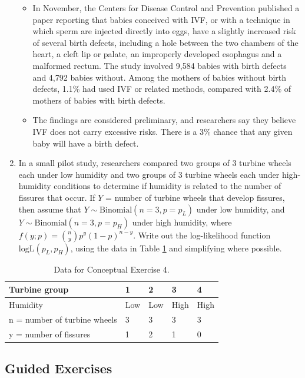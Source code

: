 \documentclass[
]{krantz}
\begin{document}
\begin{enumerate}
  \begin{itemize}
  \item
    In November, the Centers for Disease Control and Prevention published a paper reporting that babies conceived with IVF, or with a technique in which sperm are injected directly into eggs, have a slightly increased risk of several birth defects, including a hole between the two chambers of the heart, a cleft lip or palate, an improperly developed esophagus and a malformed rectum. The study involved 9,584 babies with birth defects and 4,792 babies without. Among the mothers of babies without birth defects, 1.1\% had used IVF or related methods, compared with 2.4\% of mothers of babies with birth defects.
  \item
    The findings are considered preliminary, and researchers say they believe IVF does not carry excessive risks. There is a 3\% chance that any given baby will have a birth defect.
  \end{itemize}
\item
  In a small pilot study, researchers compared two groups of 3 turbine wheels each under low humidity and two groups of 3 turbine wheels each under high-humidity conditions to determine if humidity is related to the number of fissures that occur. If \(Y\) = number of turbine wheels that develop fissures, then assume that \(Y \sim \textrm{Binomial}(n=3, p=p_L)\) under low humidity, and \(Y \sim \textrm{Binomial}(n=3, p=p_H)\) under high humidity, where \(f(y;p)=\binom{n}{y} p^y (1-p)^{n-y}\). Write out the log-likelihood function \(\textrm{logL}(p_L, p_H)\), using the data in Table \ref{tab:fissurechp6} and simplifying where possible.
\end{enumerate}

\begin{table}

\caption{\label{tab:fissurechp6}Data for Conceptual Exercise 4.}
\centering
\begin{tabular}[t]{>{\raggedright\arraybackslash}p{5cm}llll}
\toprule
Turbine group & 1 & 2 & 3 & 4\\
\midrule
Humidity & Low & Low & High & High\\
n = number of turbine wheels & 3 & 3 & 3 & 3\\
y = number of fissures & 1 & 2 & 1 & 0\\
\bottomrule
\end{tabular}
\end{table}

\hypertarget{guided-exercises-4}{%
\subsection{Guided Exercises}\label{guided-exercises-4}}
\end{document}

